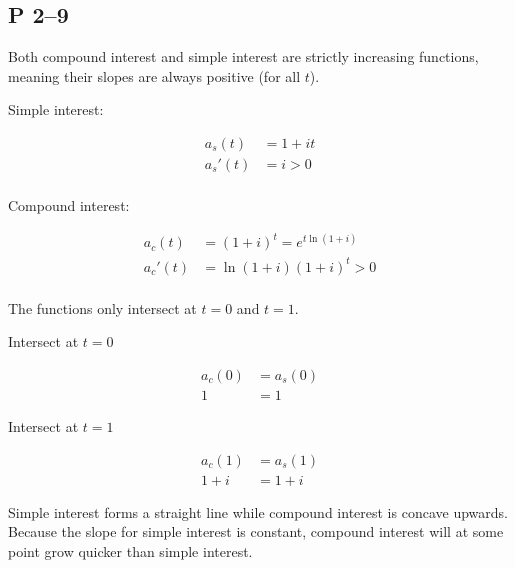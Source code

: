 \documentclass[a4paper, 12pt, reqno]{amsart}
\numberwithin{equation}{section}
\begin{document}
\subsection*{P 2--9}

Both compound interest and simple interest are strictly increasing functions,
meaning their slopes are always positive (for all $t$).

Simple interest:

\begin{equation}\nonumber
    \begin{aligned}
        a_s(t) &= 1+it              \\
        a_s'(t) &= i > 0            \\
    \end{aligned}
\end{equation}

Compound interest:

\begin{equation}\nonumber
    \begin{aligned}
        a_c(t) &= (1+i)^t = e^{t\ln(1+i)}           \\
        a_c'(t) &= \ln(1+i) (1+i)^t > 0             \\
    \end{aligned}
\end{equation}

The functions only intersect at $t=0$ and $t=1$.

Intersect at $t=0$

\begin{equation}\nonumber
    \begin{aligned}
        a_c(0) &= a_s(0)            \\
        1 &= 1
    \end{aligned}
\end{equation}

Intersect at $t=1$

\begin{equation}\nonumber
    \begin{aligned}
        a_c(1) &= a_s(1)            \\
        1+i &= 1+i
    \end{aligned}
\end{equation}

Simple interest forms a straight line while compound interest is concave
upwards. Because the slope for simple interest is constant, compound interest
will at some point grow quicker than simple interest. 
\end{document}
